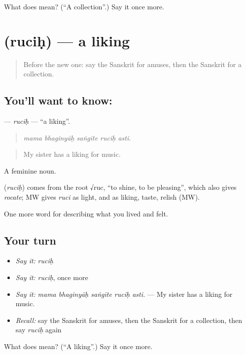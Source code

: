 \begin{tcolorbox}[breakable,colback=teal!4,colframe=teal!35!black,title={Before you move on}]
What does  mean? (\textquotedblleft{}A collection\textquotedblright{}.) Say it once more.
\end{tcolorbox}
\section[\texorpdfstring{\sk{रुचिः} (ruciḥ)}{रुचिः (ruciḥ)}]{ (ruciḥ) — a liking}

\label{lesson:SA-C516-rucih}



\begin{quote}
Before the new one: say the Sanskrit for amuses, then the Sanskrit for a collection.
\end{quote}

\subsection*{You'll want to know: }
\textbf{} — \emph{ruciḥ} — \textquotedblleft{}a liking\textquotedblright{}.

\begin{quote}
    
\end{quote}

\begin{quote}
\emph{mama bhaginyāḥ saṅgīte ruciḥ asti.}
\end{quote}

\begin{quote}
My sister has a liking for music.
\end{quote}

A feminine noun.

\begin{cousinweb}
\textbf{} (\emph{ruciḥ}) comes from the root √ruc, \textquotedblleft{}to shine, to be pleasing\textquotedblright{}, which also gives \emph{rocate}; MW gives \emph{ruci} as light, and as liking, taste, relish (MW).
\end{cousinweb}

\begin{grammarlens}[title={What you've built}]
One more word for describing what you lived and felt.
\end{grammarlens}

\subsection*{Your turn}
\begin{itemize}
\raggedright
  \item \emph{Say it:} \emph{ruciḥ}
  \item \emph{Say it:} \emph{ruciḥ}, once more
  \item \emph{Say it:} \emph{mama bhaginyāḥ saṅgīte ruciḥ asti.} — My sister has a liking for music.
  \item \emph{Recall:} say the Sanskrit for amuses, then the Sanskrit for a collection, then say \emph{ruciḥ} again
\end{itemize}

\begin{tcolorbox}[breakable,colback=teal!4,colframe=teal!35!black,title={Before you move on}]
What does  mean? (\textquotedblleft{}A liking\textquotedblright{}.) Say it once more.
\end{tcolorbox}
